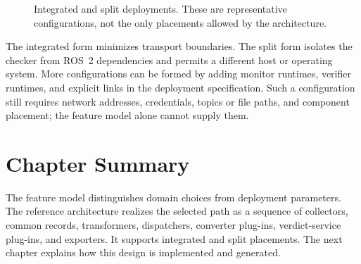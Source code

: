 \begin{figure}[htbp]
  \centering
  \resizebox{\textwidth}{!}{}
  \caption{Integrated and split deployments. These are representative
  configurations, not the only placements allowed by the architecture.}
  \label{fig:deployment-views}
\end{figure}

The integrated form minimizes transport boundaries. The split form isolates
the checker from ROS~2 dependencies and permits a different host or operating
system. More configurations can be formed by adding monitor runtimes, verifier
runtimes, and explicit links in the deployment specification. Such a
configuration still requires network addresses, credentials, topics or file
paths, and component placement; the feature model alone cannot supply them.

\section{Chapter Summary}

The feature model distinguishes domain choices from deployment parameters. The
reference architecture realizes the selected path as a sequence of collectors,
common records, transformers, dispatchers, converter plug-ins, verdict-service
plug-ins, and exporters. It supports integrated and split placements. The next chapter
explains how this design is implemented and generated.

